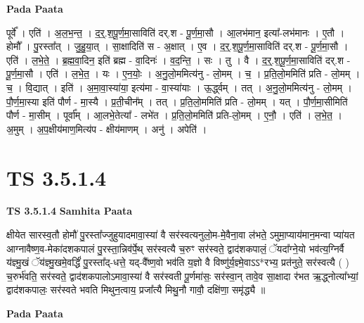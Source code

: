\documentclass[17pt]{extarticle}
\begin{document}
\textbf{Pada Paata} \newline

पूर्वे᳚ । एति॑ । अ॒ल॒भ॒न्त॒ । द॒र्॒.श॒पू॒र्ण॒मा॒साविति॑ दर्.श - पू॒र्ण॒मा॒सौ । आ॒लभ॑मान॒ इत्या᳚-लभ॑मानः । ए॒तौ । होमौ᳚ । पु॒रस्ता᳚त् । जु॒हु॒या॒त् । सा॒क्षादिति॑ स - अ॒क्षात् । ए॒व । द॒र्॒.श॒पू॒र्ण॒मा॒साविति॑ दर्.श - पू॒र्ण॒मा॒सौ । एति॑ । ल॒भे॒ते॒ । ब्र॒ह्म॒वा॒दिन॒ इति॑ ब्रह्म - वा॒दिनः॑ । व॒द॒न्ति॒ । सः । तु । वै । द॒र्॒.श॒पू॒र्ण॒मा॒साविति॑ दर्.श - पू॒र्ण॒मा॒सौ । एति॑ । ल॒भे॒त॒ । यः । ए॒न॒योः॒ । अ॒नु॒लो॒ममित्य॑नु - लो॒मम् । च॒ । प्र॒ति॒लो॒ममिति॑ प्रति - लो॒मम् । च॒ । वि॒द्यात् । इति॑ । अ॒मा॒वा॒स्या॑या॒ इत्य॑मा - वा॒स्या॑याः । ऊ॒र्द्ध्वम् । तत् । अ॒नु॒लो॒ममित्य॑नु - लो॒मम् । पौ॒र्ण॒मा॒स्या इति॑ पौर्ण - मा॒स्यै । प्र॒ती॒चीन᳚म् । तत् । प्र॒ति॒लो॒ममिति॑ प्रति - लो॒मम् । यत् । पौ॒र्ण॒मा॒सीमिति॑ पौर्ण - मा॒सीम् । पूर्वा᳚म् । आ॒लभे॒तेत्या᳚ - लभे॑त । प्र॒ति॒लो॒ममिति॑ प्रति-लो॒मम् । ए॒नौ॒ । एति॑ । ल॒भे॒त॒ । अ॒मुम् । अ॒प॒क्षीय॑माण॒मित्य॑प - क्षीय॑माणम् । अनु॑ । अपेति॑ ।  \newline




\section*{ TS 3.5.1.4 }

\textbf{TS 3.5.1.4 } \newline
\textbf{Samhita Paata} \newline

क्षीयेत सारस्व॒तौ होमौ॑ पु॒रस्ता᳚ज्जुहुयादमावा॒स्या॑ वै सर॑स्वत्यनुलो॒म-मे॒वैना॒वा ल॑भते॒ ऽमुमा॒प्याय॑मान॒मन्वा प्या॑यत आग्नावैष्ण॒व-मेका॑दशकपालं पु॒रस्ता॒न्निव॑र्पे॒थ् सर॑स्वत्यै च॒रुꣳ सर॑स्वते॒ द्वाद॑शकपालं॒ ॅयदा᳚ग्ने॒यो भव॑त्य॒ग्निर्वै य॑ज्ञ्मु॒खं ॅय॑ज्ञ्मु॒खमे॒वर्द्धिं॑ पु॒रस्ता᳚द्-धत्ते॒ यद्-वै᳚ष्ण॒वो भव॑ति य॒ज्ञो वै विष्णु॑र्य॒ज्ञ्मे॒वाऽऽ*रभ्य॒ प्रत॑नुते॒ सर॑स्वत्यै ( ) च॒रुर्भ॑वति॒ सर॑स्वते॒ द्वाद॑शकपालोऽमावा॒स्या॑ वै सर॑स्वती पू॒र्णमा॑सः॒ सर॑स्वा॒न् तावे॒व सा॒क्षादा र॑भत ऋ॒द्ध्नोत्या᳚भ्यां॒ द्वाद॑शकपालः॒ सर॑स्वते भवति मिथुन॒त्वाय॒ प्रजा᳚त्यै मिथु॒नौ गावौ॒ दक्षि॑णा॒ समृ॑द्ध्यै ॥ \newline

\textbf{Pada Paata} \newline
\end{document}
